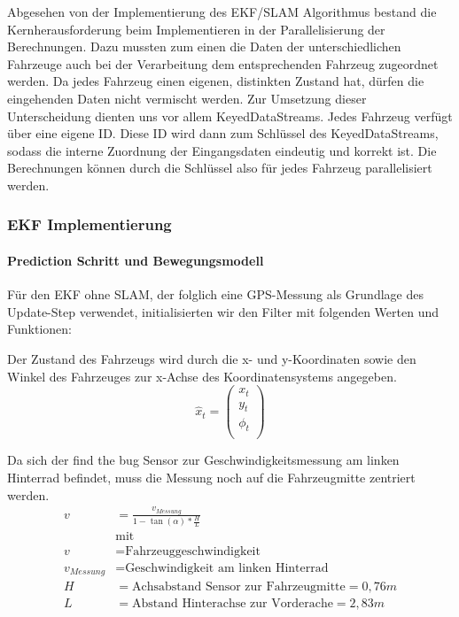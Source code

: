 \documentclass[11pt]{article}
\begin{document}
Abgesehen von der Implementierung des EKF/SLAM Algorithmus bestand die Kernherausforderung beim Implementieren in der Parallelisierung der Berechnungen. Dazu mussten zum einen die Daten der unterschiedlichen Fahrzeuge auch bei der Verarbeitung dem entsprechenden Fahrzeug zugeordnet werden. Da jedes Fahrzeug einen eigenen, distinkten Zustand hat, dürfen die eingehenden Daten nicht vermischt werden. Zur Umsetzung dieser Unterscheidung dienten uns vor allem KeyedDataStreams. Jedes Fahrzeug verfügt über eine eigene ID. Diese ID wird dann zum Schlüssel des KeyedDataStreams, sodass die interne Zuordnung der Eingangsdaten eindeutig und korrekt ist. Die Berechnungen können durch die Schlüssel also für jedes Fahrzeug parallelisiert werden.

\subsubsection{EKF Implementierung}
\paragraph{Prediction Schritt und Bewegungsmodell}
Für den EKF ohne SLAM, der folglich eine GPS-Messung als Grundlage des Update-Step verwendet, initialisierten wir den Filter mit folgenden Werten und Funktionen:

Der Zustand des Fahrzeugs wird durch die x- und y-Koordinaten sowie den Winkel des Fahrzeuges zur x-Achse des Koordinatensystems angegeben.
\begin{equation}\label{EKF-State-Vector}
	\hat{x}_t = \begin{pmatrix}
		x_t \\
		y_t \\
		\phi_t \\
	  \end{pmatrix}
\end{equation}

Da sich der find the bug Sensor zur Geschwindigkeitsmessung am linken Hinterrad befindet, muss die Messung noch auf die Fahrzeugmitte zentriert werden.
\begin{equation}\label{Geschwindikeit}
\begin{split}
	v &= \frac{v_{Messung}}{1-\tan(\alpha)*\frac{H}{L}} \\
	&\text{mit } \\
	v &= \text{Fahrzeuggeschwindigkeit} \\
	v_{Messung} &= \text{Geschwindigkeit am linken Hinterrad} \\
	H &= \text{Achsabstand Sensor zur Fahrzeugmitte} = 0,76m \\
	L &= \text{Abstand Hinterachse zur Vorderache} = 2,83m
\end{split}
\end{equation}
\end{document}
